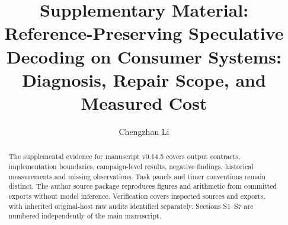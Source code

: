 \documentclass[final,5p,times,twocolumn]{elsarticle}
\begin{document}
\begin{frontmatter}
\title{Supplementary Material: Reference-Preserving Speculative Decoding on Consumer Systems: Diagnosis, Repair Scope, and Measured Cost}
\author{Chengzhan Li}
\address{University of Electronic Science and Technology of China\\[2pt]
{\normalfont\ttfamily\href{mailto:chengzhan.li@std.uestc.edu.cn}{chengzhan.li@std.uestc.edu.cn}}}
\begin{abstract}
The supplemental evidence for manuscript v0.14.5 covers output contracts, implementation boundaries, campaign-level results, negative findings, historical measurements and missing observations. Task panels and timer conventions remain distinct. The author source package reproduces figures and arithmetic from committed exports without model inference. Verification covers inspected sources and exports, with inherited original-host raw audits identified separately. Sections S1--S7 are numbered independently of the main manuscript.
\end{abstract}
\end{frontmatter}
\renewcommand{\thesection}{S\arabic{section}}
\renewcommand{\thetable}{S\arabic{table}}
\renewcommand{\thefigure}{S\arabic{figure}}
\renewcommand{\theequation}{S\arabic{equation}}
\setcounter{tocdepth}{2}
\tableofcontents








\FloatBarrier
\begingroup\small

\endgroup
\end{document}
